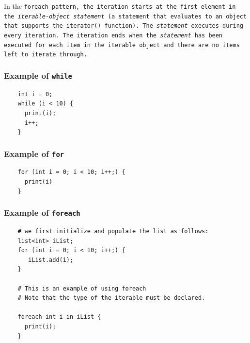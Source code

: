 \documentclass{report}
\begin{document}
In the \tt foreach \rm pattern, the iteration starts at the first element in the
\emph{iterable-object statement} (a statement that evaluates to an object that
supports the \tt iterator() \rm function). The \emph{statement} executes during
every iteration. The iteration ends when the \emph{statement} has been executed
for each item in the iterable object and there are no items left to iterate
through.

\subsubsection{Example of \tt while \rm} %
\label{ssub:example_1}

\begin{verbatim}
    int i = 0;
    while (i < 10) {
      print(i);
      i++;
    }

\end{verbatim}


\subsubsection{Example of \tt for \rm} %
\label{ssub:example_2}

\begin{verbatim}
    for (int i = 0; i < 10; i++;) {
      print(i)
    }
\end{verbatim}


\subsubsection{Example of \tt foreach \rm} %
\label{ssub:example_3}

\begin{verbatim}
    # we first initialize and populate the list as follows: 
    list<int> iList;
    for (int i = 0; i < 10; i++;) {
       iList.add(i);
    }

    # This is an example of using foreach
    # Note that the type of the iterable must be declared.    

    foreach int i in iList {
      print(i);
    }
\end{verbatim}



\end{document}
